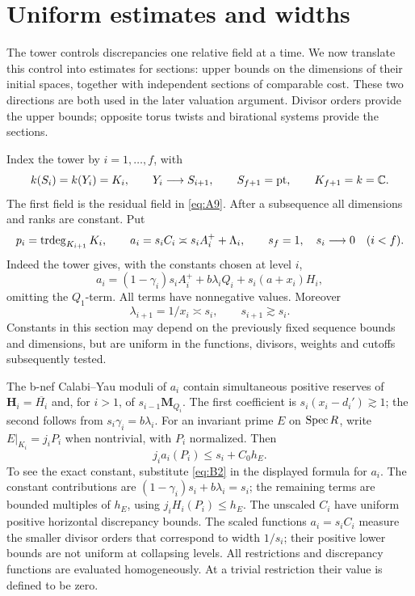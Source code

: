 \section{Uniform estimates and widths}
\label{b:width-estimates}

The tower controls discrepancies one relative field at a time. We now
translate this control into estimates for sections: upper bounds on the
dimensions of their initial spaces, together with independent sections
of comparable cost. These two directions are both used in the later
valuation argument. Divisor orders provide the upper bounds; opposite
torus twists and birational systems provide the sections.

Index the tower by \(i=1,\ldots,f\), with
\[
 k(S_i)=k(Y_i)=K_i,\qquad
 Y_i\longrightarrow S_{i+1},\qquad
 S_{f+1}=\mathrm{pt},\qquad K_{f+1}=k=\mathbb C.
\]
The first field is the residual field in \eqref{eq:A9}.
After a subsequence all dimensions and ranks are constant. Put
\[
 p_i=\operatorname{trdeg}_{K_{i+1}}K_i,\qquad
 a_i=s_iC_i\asymp s_iA_i^++\Lambda_i,\qquad
 s_f=1,\quad s_i\longrightarrow0\quad(i<f).
\]
Indeed the tower gives, with the constants chosen at level \(i\),
\[
 a_i=(1-\gamma_i)s_iA_i^+
           +b\lambda_iQ_i+s_i(a+x_i)H_i,
\]
omitting the \(Q_1\)-term. All terms have nonnegative values.
Moreover
\[
 \lambda_{i+1}=1/x_i\asymp s_i,\qquad s_{i+1}\gtrsim s_i.
\]
Constants in this section may depend on the previously fixed
sequence bounds and dimensions, but are uniform in the functions,
divisors, weights and cutoffs subsequently tested.

The b-nef Calabi--Yau moduli of \(a_i\) contain simultaneous
positive reserves of \(\mathbf H_i=\overline{H_i}\) and, for \(i>1\),
of \(s_{i-1}\mathbf M_{Q_i}\). The first coefficient is
\(s_i(x_i-d_i')\gtrsim1\); the second follows from
\(s_i\gamma_i=b\lambda_i\).
For an invariant prime \(E\) on \(\operatorname{Spec} R\), write
\(E|_{K_i}=j_iP_i\) when nontrivial, with \(P_i\) normalized. Then
\begin{equation}\label{b:scaled-witness}
                         j_ia_i(P_i)\le s_i+C_0h_E.
\end{equation}
To see the exact constant, substitute \eqref{eq:B2} in the displayed
formula for \(a_i\). The constant contributions are
\((1-\gamma_i)s_i+b\lambda_i=s_i\); the remaining terms are bounded
multiples of \(h_E\), using \(j_iH_i(P_i)\le h_E\).
The unscaled $C_i$ have uniform positive horizontal discrepancy bounds.
The scaled functions $a_i=s_iC_i$ measure the smaller divisor orders
that correspond to width $1/s_i$; their positive lower bounds are not
uniform at collapsing levels. All restrictions and discrepancy functions
are evaluated homogeneously. At a trivial restriction their value is defined to
be zero.

